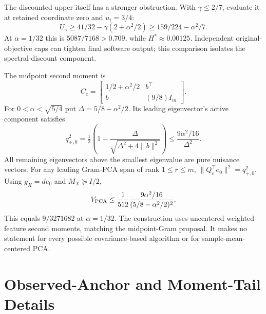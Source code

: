 The discounted upper itself has a stronger obstruction. With $\gamma\leq2/7$, evaluate it at retained coordinate zero and $u_i=3/4$:
\[
 U_\gamma\geq41/32-\gamma(2+\alpha^2/2)
 \geq159/224-\alpha^2/7.
\]
At $\alpha=1/32$ this is $5087/7168>0.709$, while $H^*\approx0.00125$. Independent original-objective caps can tighten final software output; this comparison isolates the spectral-discount component.

The midpoint second moment is
\[
 C_c=\begin{bmatrix}1/2+\alpha^2/2&b^\top\\b&(9/8)I_m\end{bmatrix}.
\]
For $0<\alpha<\sqrt{5/4}$ put $\Delta=5/8-\alpha^2/2$. Its leading eigenvector's active component satisfies
\[
 q_{+,0}^2=\tfrac12\left(1-\frac\Delta{\sqrt{\Delta^2+4\|b\|^2}}\right)
 \leq\frac{9\alpha^2/16}{\Delta^2}.
\]
All remaining eigenvectors above the smallest eigenvalue are pure nuisance vectors. For any leading Gram-PCA span of rank $1\leq r\leq m$, $\|Q_c^\top e_0\|^2=q_{+,0}^2$. Using $g_X=de_0$ and $M_X\succeq I/2$,
\[
 V_{\rm PCA}\leq\frac1{512}\frac{9\alpha^2/16}{(5/8-\alpha^2/2)^2}.
\]
This equals $9/3271682$ at $\alpha=1/32$. The construction uses uncentered weighted feature second moments, matching the midpoint-Gram proposal. It makes no statement for every possible covariance-based algorithm or for sample-mean-centered PCA.












\section{Observed-Anchor and Moment-Tail Details}\label{app:new}
